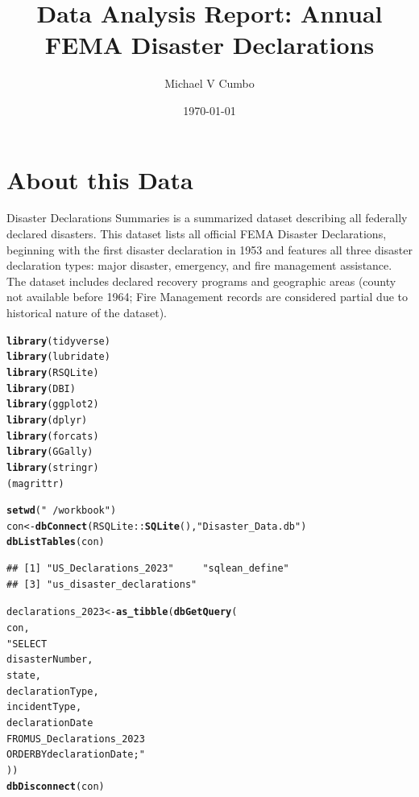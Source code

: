 \documentclass[12pt]{report}\usepackage[]{graphicx}\usepackage[]{xcolor}
\title{\textbf{Data Analysis Report:
Annual FEMA Disaster Declarations}}
\author{Michael V Cumbo}
\date{\today}
\makeatletter
\newcommand{\hlstr}[1]{\textcolor[rgb]{0.192,0.494,0.8}{#1}}%
\newcommand{\hlopt}[1]{\textcolor[rgb]{0,0,0}{#1}}%
\newcommand{\hlstd}[1]{\textcolor[rgb]{0.345,0.345,0.345}{#1}}%
\newcommand{\hlkwb}[1]{\textcolor[rgb]{0.69,0.353,0.396}{#1}}%
\newcommand{\hlkwd}[1]{\textcolor[rgb]{0.737,0.353,0.396}{\textbf{#1}}}%
\newenvironment{kframe}{%
 \def\at@end@of@kframe{}%
 \ifinner\ifhmode%
  \def\at@end@of@kframe{\end{minipage}}%
  \begin{minipage}{\columnwidth}%
 \fi\fi%
 \def\FrameCommand##1{\hskip\@totalleftmargin \hskip-\fboxsep
 \colorbox{shadecolor}{##1}\hskip-\fboxsep
     \hskip-\linewidth \hskip-\@totalleftmargin \hskip\columnwidth}%
 \MakeFramed {\advance\hsize-\width
   \@totalleftmargin\z@ \linewidth\hsize
   \@setminipage}}%
 {\par\unskip\endMakeFramed%
 \at@end@of@kframe}
\newenvironment{knitrout}{}{} %
\makeatother
\begin{document}
\maketitle
\section{About this Data}
\begin{center}
\indent\parbox{15cm}{
  Disaster Declarations Summaries is a summarized dataset describing all federally declared disasters. This dataset lists all official FEMA Disaster Declarations, beginning with the first disaster declaration in 1953 and features all three disaster declaration types: major disaster, emergency, and fire management assistance. The dataset includes declared recovery programs and geographic areas (county not available before 1964; Fire Management records are considered partial due to historical nature of the dataset).
}
\end{center}
\begin{knitrout}
\color{fgcolor}\begin{kframe}
\begin{alltt}
\hlkwd{library}\hlstd{(tidyverse)}
\hlkwd{library}\hlstd{(lubridate)}
\hlkwd{library}\hlstd{(RSQLite)}
\hlkwd{library}\hlstd{(DBI)}
\hlkwd{library}\hlstd{(ggplot2)}
\hlkwd{library}\hlstd{(dplyr)}
\hlkwd{library}\hlstd{(forcats)}
\hlkwd{library}\hlstd{(GGally)}
\hlkwd{library}\hlstd{(stringr)}
\hlstd{(magrittr)}

\hlkwd{setwd}\hlstd{(}\hlstr{"~/workbook"}\hlstd{)}
\hlstd{con} \hlkwb{<-} \hlkwd{dbConnect}\hlstd{(RSQLite}\hlopt{::}\hlkwd{SQLite}\hlstd{(),} \hlstr{"Disaster_Data.db"}\hlstd{)}
\hlkwd{dbListTables}\hlstd{(con)}
\end{alltt}
\begin{verbatim}
## [1] "US_Declarations_2023"     "sqlean_define"           
## [3] "us_disaster_declarations"
\end{verbatim}
\begin{alltt}
\hlstd{declarations_2023} \hlkwb{<-} \hlkwd{as_tibble}\hlstd{(}\hlkwd{dbGetQuery}\hlstd{(}
  \hlstd{con,}
  \hlstr{"SELECT
  disasterNumber,
  state,
  declarationType,
  incidentType,
  declarationDate
  FROM US_Declarations_2023
ORDER BY declarationDate;"}
\hlstd{))}
\hlkwd{dbDisconnect}\hlstd{(con)}
\end{alltt}
\end{kframe}
\end{knitrout}
\end{document}
